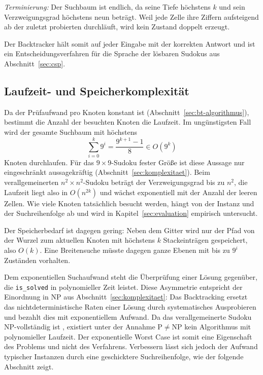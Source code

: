 \emph{Terminierung:} Der Suchbaum ist endlich, da seine Tiefe höchstens $k$ und sein Verzweigungsgrad höchstens neun beträgt. 
Weil jede Zelle ihre Ziffern aufsteigend ab der zuletzt probierten durchläuft, wird kein Zustand doppelt erzeugt.

Der Backtracker hält somit auf jeder Eingabe mit der korrekten Antwort 
und ist ein Entscheidungsverfahren für die Sprache der lösbaren Sudokus aus Abschnitt~\ref{sec:csp}.

\subsection{Laufzeit- und Speicherkomplexität}\label{sec:bt-komplexitaet}

Da der Prüfaufwand pro Knoten konstant ist (Abschnitt~\ref{sec:bt-algorithmus}), 
bestimmt die Anzahl der besuchten Knoten die Laufzeit. 
Im ungünstigsten Fall wird der gesamte Suchbaum mit höchstens
\begin{equation}
	\sum_{i=0}^{k} 9^i = \frac{9^{k+1} - 1}{8} \in O(9^k)
\end{equation}
Knoten durchlaufen. Für das $9 \times 9$-Sudoku fester Größe ist diese Aussage 
nur eingeschränkt aussagekräftig (Abschnitt~\ref{sec:komplexitaet}). 
Beim verallgemeinerten $n^2 \times n^2$-Sudoku beträgt der Verzweigungsgrad bis zu $n^2$, 
die Laufzeit liegt also in $O(n^{2k})$ und wächst exponentiell mit der Anzahl der leeren Zellen. 
Wie viele Knoten tatsächlich besucht werden, hängt von der Instanz und der Suchreihenfolge ab 
und wird in Kapitel~\ref{sec:evaluation} empirisch untersucht.

Der Speicherbedarf ist dagegen gering: Neben dem Gitter wird nur der Pfad von der Wurzel zum aktuellen Knoten 
mit höchstens $k$ Stackeinträgen gespeichert, also $O(k)$. 
Eine Breitensuche müsste dagegen ganze Ebenen mit bis zu $9^i$ Zuständen vorhalten.

Dem exponentiellen Suchaufwand steht die Überprüfung einer Lösung gegenüber, 
die \texttt{is\_solved} in polynomieller Zeit leistet. 
Diese Asymmetrie entspricht der Einordnung in NP aus Abschnitt~\ref{sec:komplexitaet}: 
Das Backtracking ersetzt das nichtdeterministische Raten einer Lösung durch systematisches Ausprobieren 
und bezahlt dies mit exponentiellem Aufwand. 
Da das verallgemeinerte Sudoku NP-vollständig ist , 
existiert unter der Annahme $\mathrm{P} \neq \mathrm{NP}$ kein Algorithmus mit polynomieller Laufzeit. 
Der exponentielle Worst Case ist somit eine Eigenschaft des Problems und nicht des Verfahrens. 
Verbessern lässt sich jedoch der Aufwand typischer Instanzen durch eine geschicktere Suchreihenfolge, 
wie der folgende Abschnitt zeigt.

